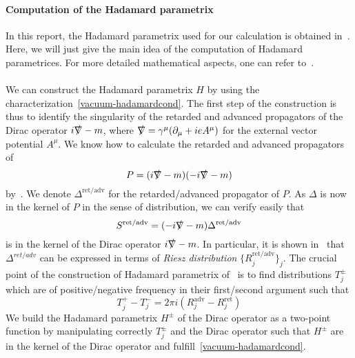 \paragraph{Computation of the Hadamard parametrix}
In this report, the Hadamard parametrix used for our calculation is obtained in~\cite{Zahn2015}. 
Here, we will just give the main idea of the computation of Hadamard parametrices. 
For more detailed mathematical aspects, one can refer to~\cite{Bar2008}. \\\\
%
We can construct the Hadamard parametrix $H$ by using the characterization~\cref{vacuum-hadamardcond}. 
The first step of the construction is thus to identify the singularity of the retarded and advanced propagators of the Dirac operator $i\slashed{\nabla} - m$, where $\slashed{\nabla} = \gamma^\mu(\partial_\mu + ieA^\mu)$ for the external vector potential $A^\mu$. 
We know how to calculate the retarded and advanced propagators of 
\begin{equation*}
P = (i\slashed{\nabla} - m)(-i\slashed{\nabla} -m) 
\end{equation*}
by~\cite{Bar2008}.
We denote $\Delta^{\mathrm{ret/adv}}$ for the retarded/advanced propagator of $P$.
As $\Delta$ is now in the kernel of $P$ in the sense of distribution, 
we can verify easily that 
\begin{equation*}
S^{\textrm{ret/adv}} = (-i\slashed{\nabla} - m)\Delta^{\textrm{ret/adv}} 
\end{equation*}
is in the kernel of the Dirac operator $i\slashed{\nabla} - m$.
In particular, it is shown in~\cite{Bar2008} that $\Delta^{ret/adv}$ can be expressed in terms of \textit{Riesz distribution} $\{R_j^{\mathrm{ret/adv}}\}_j$.
The crucial point of the construction of Hadamard parametrix of~\cite{Zahn2015} is to find distributions $T_j^{\pm}$ which are of positive/negative frequency in their first/second argument such that
\begin{equation*}
T_j^+ - T_j^- = 2\pi i(R_j^{\mathrm{adv}} - R_j^{\mathrm{ret}})
\end{equation*} 
We build the Hadamard parametrix $H^\pm$ of the Dirac operator as a two-point function by manipulating correctly $T_j^{\pm}$ and the Dirac operator such that $H^\pm$ are in the kernel of the Dirac operator 
and fulfill~\cref{vacuum-hadamardcond}.
%
